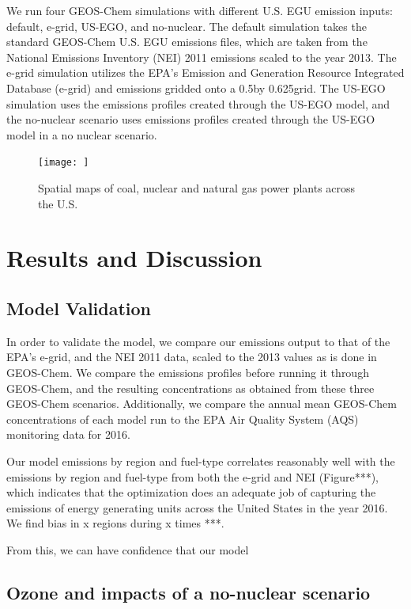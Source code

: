 \documentclass[12]{article}
\begin{document}
We run four GEOS-Chem simulations with different U.S. EGU emission inputs: default, e-grid, US-EGO, and no-nuclear. The default simulation takes the standard GEOS-Chem U.S. EGU emissions files, which are taken from the National Emissions Inventory (NEI) 2011 emissions scaled to the year 2013. The e-grid simulation utilizes the EPA's Emission and Generation Resource Integrated Database (e-grid) \citep{epa_emissions_2016}  and  emissions gridded onto a 0.5\degree by 0.625\degree grid. The US-EGO simulation uses the emissions profiles created through the US-EGO model, and the no-nuclear scenario uses emissions profiles created through the US-EGO model in a no nuclear scenario. 

\begin{figure}
    \centering
    \texttt{[image: ]}
    \caption{Spatial maps of coal, nuclear and natural gas power plants across the U.S.} 
    \label{fig:plants}
\end{figure}

\section{Results and Discussion}
\subsection{Model Validation}

In order to validate the model, we compare our emissions output to that of the EPA's e-grid, and the NEI 2011 data, scaled to the 2013 values as is done in GEOS-Chem. We compare the emissions profiles before running it through GEOS-Chem, and the resulting concentrations as obtained from these three GEOS-Chem scenarios. Additionally, we compare the annual mean GEOS-Chem concentrations of each model run to the EPA Air Quality System (AQS) monitoring data for 2016. 

Our model emissions by region and fuel-type correlates reasonably well with the emissions by region and fuel-type from both the e-grid and NEI (Figure***), which indicates that the optimization does an adequate job of capturing the emissions of energy generating units across the United States in the year 2016. We find bias in x regions during x times ***.

From this, we can have confidence that our model 
\subsection{Ozone and  impacts of a no-nuclear scenario}
\end{document}
